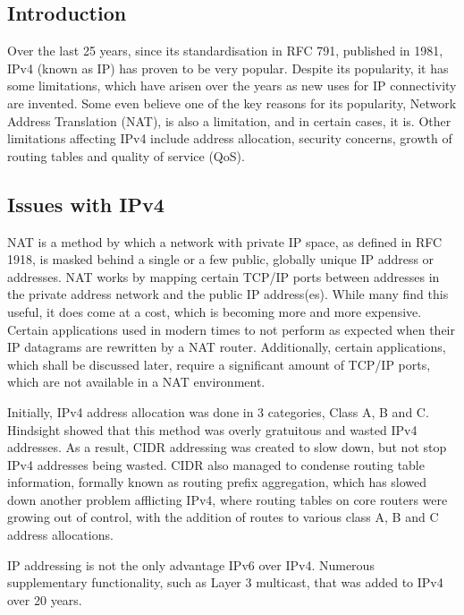 
\subsection{Introduction}

Over the last 25 years, since its standardisation in RFC 791, published
in 1981, IPv4 (known as IP) has proven to be very popular. Despite its 
popularity, it has some limitations, which have arisen over the years 
as new uses for IP connectivity are invented. Some even believe one of 
the key reasons for its popularity, Network Address Translation (NAT), 
is also a limitation, and in certain cases, it is. Other limitations
affecting IPv4 include address allocation, security concerns, growth of 
routing tables and quality of service (QoS).

\subsection{Issues with IPv4}

NAT is a method by which a network with private IP space, as defined in
RFC 1918, is masked behind a single or a few public, globally unique IP
address or addresses. NAT works by mapping certain TCP/IP ports between
addresses in the private address network and the public IP address(es).
While many find this useful, it does come at a cost, which is becoming
more and more expensive. Certain applications used in modern times to
not perform as expected when their IP datagrams are rewritten by a NAT
router. Additionally, certain applications, which shall be discussed
later, require a significant amount of TCP/IP ports, which are not
available in a NAT environment.


Initially, IPv4 address allocation was done in 3 categories, Class A, B
and C. Hindsight showed that this method was overly gratuitous and
wasted IPv4 addresses. As a result, CIDR addressing was created to slow 
down, but not stop IPv4 addresses being wasted. CIDR also managed to condense 
routing table information, formally known as routing prefix aggregation, 
which has slowed down another problem afflicting IPv4, where routing tables 
on core routers were growing out of control, with the addition of routes to
various class A, B and C address allocations.


IP addressing is not the only advantage IPv6 over IPv4. Numerous
supplementary functionality, such as Layer 3 multicast, that was added to IPv4 over 20 years.


